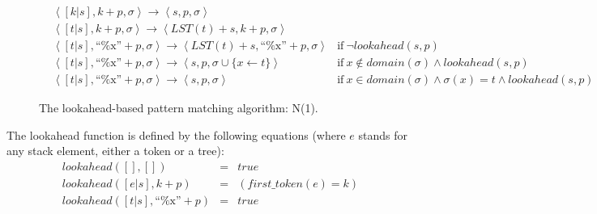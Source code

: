 \documentclass{sigplanconf}
\begin{document}
\begin{figure}
\begin{eqnarray}
&\left<[k | s], k+p, \sigma\right> \longrightarrow 
  \left<s, p, \sigma\right> \\
\label{rule:unparse-tok}
&\left<[t | s], k+p, \sigma\right> \longrightarrow 
  \left<LST(t)+s, k+p, \sigma\right> \\
\label{rule:unparse-var-la}
&\left<[t | s], \mbox{``\%x''}+p, \sigma\right> \longrightarrow 
  \left<LST(t)+s, \mbox{``\%x''}+p, \sigma\right> 
  & \mbox{if}\  \neg lookahead(s,p) \\
\label{rule:bind-la}
&\left<[t | s], \mbox{``\%x''}+p, \sigma\right> \longrightarrow 
  \left<s, p, \sigma \cup \{x\gets t\}\right> 
  & \mbox{if}\  x\not\in domain(\sigma) \land lookahead(s,p)\\
\label{rule:cmpok}
&\left<[t | s], \mbox{``\%x''}+p, \sigma\right> \longrightarrow 
  \left<s, p, \sigma\right> 
  & \mbox{if}\  x\in domain(\sigma) \land \sigma(x)=t \land lookahead(s,p)
\end{eqnarray}
\caption{The lookahead-based pattern matching algorithm: N(1).}
\label{fig:lapm}
\end{figure}

The lookahead function is defined by the following equations (where
$e$ stands for any stack element, either a token or a tree):
\begin{eqnarray*}
lookahead([], [])&=&true \\
lookahead([e | s], k+p)&=& (first\_token(e)=k) \\
lookahead([t | s], \mbox{``\%x''}+p)&=&true
\end{eqnarray*}
\end{document}

